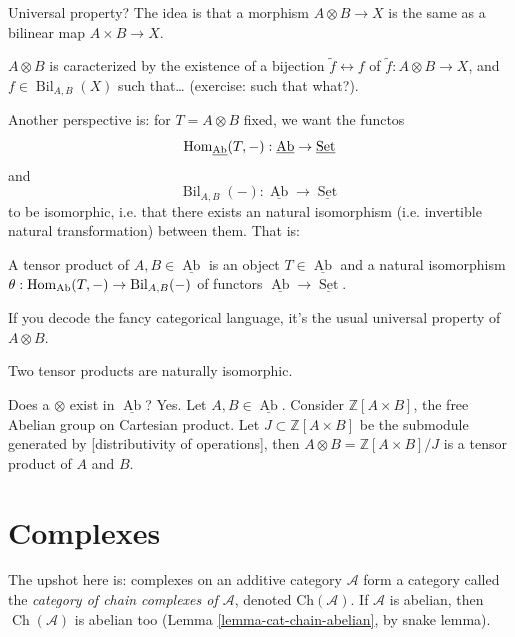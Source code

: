 Universal property? The idea is that
a morphism $A \otimes B \to X$
is the same as a bilinear map
$A \times B \to X$.

$A \otimes B$ is caracterized by
the existence of a bijection
$\tilde{f} \leftrightarrow f$
of $\tilde{f}:A \otimes B \to X$,
and $f \in \operatorname{Bil}_{A,B}(X)$
such that… (exercise: such that what?).

\medskip\noindent
Another perspective is: for $T=A \otimes B$
fixed, we want the functos
$$
\mathop{\mathrm{Hom}}\nolimits_{\underline{\operatorname{Ab}}}
(T,-):\underline{\operatorname{Ab}}
\to \underline{\operatorname{Set}}
$$
and
$$
\operatorname{Bil}_{A,B}(-):
\underline{\operatorname{Ab}}
\to \underline{\operatorname{Set}}
$$
to be isomorphic, i.e. that there exists
an natural isomorphism (i.e. invertible
natural transformation) between them.
That is:

\begin{definition}
\label{definition-tensor-product-categorical}
A tensor product of $A,B \in \underline{\operatorname{Ab}}$
is an object $T \in \underline{\operatorname{Ab}}$
and a natural isomorphism
$\theta:\mathop{\mathrm{Hom}}\nolimits_{\operatorname{Ab}}(T,-)
\to \operatorname{Bil}_{A,B}(-)$
of functors $\underline{\operatorname{Ab}}
\to \underline{\operatorname{Set}}$.
\end{definition}

\noindent
If you decode the fancy categorical
language, it's the usual universal
property of $A \otimes B$.

\begin{lemma}
\label{lemma-tensor-product-uniqueness}
Two tensor products are naturally
isomorphic.
\end{lemma}

\noindent
Does a $\otimes$ exist in
$\underline{\operatorname{Ab}}$? Yes.
Let $A,B \in \underline{\operatorname{Ab}}$.
Consider $\mathbb{Z}[A \times B]$,
the free Abelian group on Cartesian
product. Let $J \subset \mathbb{Z}[A\times
B]$ be the submodule generated
by [distributivity of operations],
then $A \otimes B=\mathbb{Z}[A\times B]/J$
is a tensor product of $A$ and $B$.

\section{Complexes}
\label{section-complexes}

\noindent
The upshot here is:
complexes on an additive category
$\mathcal{A}$ form a category called
the {\it category of chain complexes of
$\mathcal{A}$},
denoted $\text{Ch}(\mathcal{A})$.
If $\mathcal{A}$ is abelian, then
$\operatorname{Ch}(\mathcal{A})$
is abelian too
(Lemma \ref{lemma-cat-chain-abelian},
by snake lemma).


